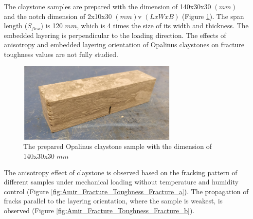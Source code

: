 The claystone samples are prepared with the dimension of 140x30x30 $(mm)$ and the notch dimension of 2x10x30 $(mm)$v $(LxWxB)$  (Figure \ref{fig:Amir_Fracture_Toughness_Sample}). The span length ($S_{flex}$) is 120 $mm$, which is 4 times the size of its width and thickness. The embedded layering is perpendicular to the loading direction. The effects of anisotropy and embedded layering orientation of Opalinus claystones on fracture toughness values are not fully studied. 

\begin{figure}[!ht]
\centering
\includegraphics[width=8cm,height=4cm]{figures/Amir_Fracture_Toughness_Sample.png}
\caption{The prepared Opalinus claystone sample with the dimension of 140x30x30 $mm$}
\label{fig:Amir_Fracture_Toughness_Sample}
\end{figure} 

The anisotropy effect of claystone is observed based on the fracking pattern of different samples under mechanical loading without temperature and humidity control (Figure \ref{fig:Amir_Fracture_Toughness_Fracture_a}). The propagation of fracks parallel to the layering orientation, where the sample is weakest, is observed (Figure \ref{fig:Amir_Fracture_Toughness_Fracture_b}).

